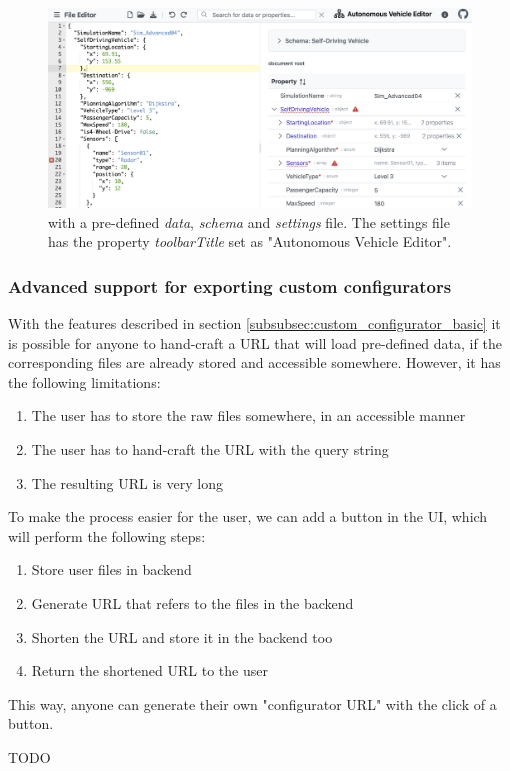 \begin{figure}
    \includegraphics[width=\textwidth]{figures/custom_configurator}
    \caption{\toolname{} with a pre-defined \textit{data}, \textit{schema} and \textit{settings} file. The settings file has the property \textit{toolbarTitle} set as "Autonomous Vehicle Editor".}
    \label{fig:custom_configurator}
\end{figure}


\subsubsection{Advanced support for exporting custom configurators}

With the features described in section \ref{subsubsec:custom_configurator_basic} it is possible for anyone to hand-craft a \toolname{} URL that will load pre-defined data, if the corresponding files are already stored and accessible somewhere.
However, it has the following limitations:
\begin{enumerate}
	\item The user has to store the raw files somewhere, in an accessible manner
	\item The user has to hand-craft the \toolname{} URL with the query string
	\item The resulting URL is very long
\end{enumerate}

To make the process easier for the user, we can add a button in the \toolname{} UI, which will perform the following steps:
\begin{enumerate}
	\item Store user files in backend
	\item Generate URL that refers to the files in the backend
	\item Shorten the URL and store it in the backend too
	\item Return the shortened URL to the user
\end{enumerate}

This way, anyone can generate their own "configurator URL" with the click of a button.

TODO